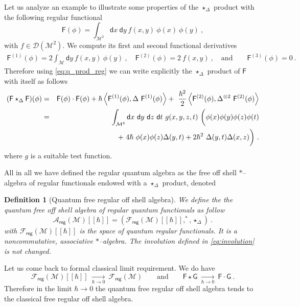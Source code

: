 \documentclass[11pt]{book}
\newcommand{\reg}{\mathsf{reg}}
\newcommand{\sm}[1]{\left\langle#1\right\rangle}
\newcommand{\Acal}{\mathcal{A}}
\newcommand{\Dcal}{\mathcal{D}}
\newcommand{\Fcal}{\mathcal{F}}
\newcommand{\Mcal}{\mathcal{M}}
\newcommand{\Fsf}{\mathsf{F}}
\newcommand{\Gsf}{\mathsf{G}}
\newcommand{\dsf}{\mathsf{d}}
\theoremstyle{break}
\newtheorem{definition}{Definition}[chapter]
\begin{document}
\bigskip


Let us analyze an example to illustrate some properties of the $\star_\Delta$ product with the following regular functional
%
\begin{equation*}
\Fsf(\phi) = \int_{\Mcal^2} \dsf x \ \dsf y \ f(x,y) \ \phi(x) \ \phi(y) \ ,
\end{equation*}
%
with $f \in \Dcal(\Mcal^2)$. We compute its first and second functional derivatives
%
\begin{eqnarray*}
\Fsf^{(1)}(\phi) = 2 \int_\Mcal \dsf y \ f(x,y) \ \phi(y) \ , 
\quad 
\Fsf^{(2)}(\phi) = 2 \ f(x,y) \ , 
\quad \mbox{and} \qquad 
\Fsf^{(3)}(\phi) = 0 \ .
\end{eqnarray*}
%
Therefore using \eqref{eq:q_prod_reg} we can write explicitly the $\star_\Delta$ product of $\Fsf$ with itself as follows
%
\begin{eqnarray*}
(\Fsf \star_\Delta \Fsf)(\phi) &=& \Fsf(\phi) \cdot \Fsf(\phi) + \hbar \sm{ \Fsf^{(1)}(\phi) , \Delta \ \Fsf^{(1)}(\phi) } + \ \frac{\hbar^2}{2} \sm{ \Fsf^{(2)}(\phi) , \Delta^{\otimes 2} \ \Fsf^{(2)}(\phi)} \\
%
&=& \int_{\Mcal^4} \dsf x \ \dsf y \ \dsf z \ \dsf t \ g(x,y,z,t) \ \bigg( \phi(x) \phi(y) \phi(z) \phi(t) \\
&& \hspace*{60pt} + \ 4 \hbar \ \phi(x) \phi(z) \Delta(y,t) + 2 \hbar^2 \ \Delta(y,t) \Delta(x,z) \bigg) \ .
\end{eqnarray*}
%
where $g$ is a suitable test function. 


\bigskip


All in all we have defined the regular quantum algebra as the free off shell $\ast$--algebra of regular functionals endowed with a $\star_\Delta$ product, denoted


\begin{definition}[Quantum free regular off shell algebra]\label{def:alg_q_reg}
We define the the quantum free off shell algebra of regular quantum functionals as follow
%
\begin{equation*}
\Acal_\reg(\Mcal)[[\hbar]] = \left(\Fcal_\reg(\Mcal)[[\hbar]] , ^\ast , \star_{\Delta} \right) \ . 
\end{equation*}
%
with $\Fcal_\reg(\Mcal)[[\hbar]]$ is the space of quantum regular functionals. It is a noncommutative, associative $\ast$--algebra. The involution defined in \eqref{eq:involution} is not changed.
\end{definition}


Let us come back to formal classical limit requirement. We do have
%
\begin{equation*}
\Fcal_\reg(\Mcal)[[\hbar]] \ \underset{\hbar \to 0}{\longrightarrow} \ \Fcal_\reg(\Mcal)\qquad \mbox{and} \qquad \Fsf \star \Gsf \ \underset{\hbar \to 0}{\longrightarrow} \ \Fsf \cdot \Gsf \ . 
\end{equation*}
%
Therefore in the limit $\hbar \to 0$ the quantum free regular off shell algebra tends to the classical free regular off shell algebra.
\end{document}
